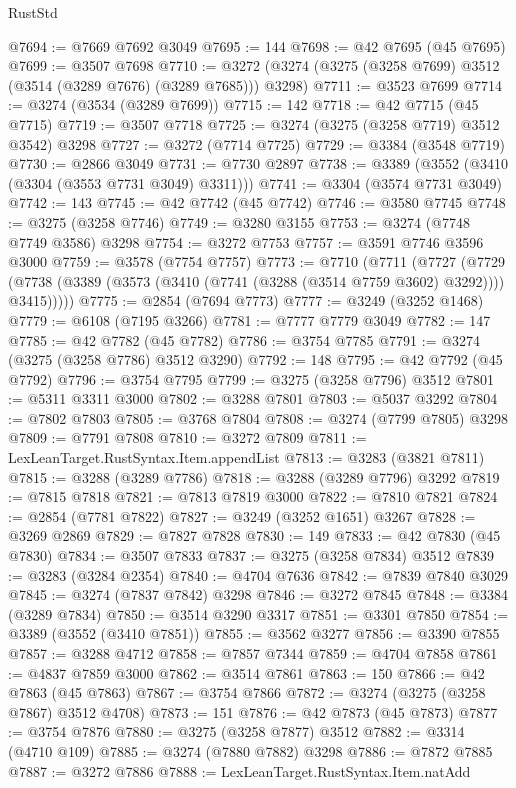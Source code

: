 \begin{lexlean}{RustStd}
\begin{coremodule}
@7694 := @7669 @7692 @3049
@7695 := 144
@7698 := @42 @7695 (@45 @7695)
@7699 := @3507 @7698
@7710 := @3272 (@3274 (@3275 (@3258 @7699) @3512 (@3514 (@3289 @7676) (@3289 @7685))) @3298)
@7711 := @3523 @7699
@7714 := @3274 (@3534 (@3289 @7699))
@7715 := 142
@7718 := @42 @7715 (@45 @7715)
@7719 := @3507 @7718
@7725 := @3274 (@3275 (@3258 @7719) @3512 @3542) @3298
@7727 := @3272 (@7714 @7725)
@7729 := @3384 (@3548 @7719)
@7730 := @2866 @3049
@7731 := @7730 @2897
@7738 := @3389 (@3552 (@3410 (@3304 (@3553 @7731 @3049) @3311)))
@7741 := @3304 (@3574 @7731 @3049)
@7742 := 143
@7745 := @42 @7742 (@45 @7742)
@7746 := @3580 @7745
@7748 := @3275 (@3258 @7746)
@7749 := @3280 @3155
@7753 := @3274 (@7748 @7749 @3586) @3298
@7754 := @3272 @7753
@7757 := @3591 @7746 @3596 @3000
@7759 := @3578 (@7754 @7757)
@7773 := @7710
    (@7711
      (@7727
        (@7729 (@7738 (@3389 (@3573 (@3410 (@7741 (@3288 (@3514 @7759 @3602) @3292)))) @3415)))))
@7775 := @2854 (@7694 @7773)
@7777 := @3249 (@3252 @1468)
@7779 := @6108 (@7195 @3266)
@7781 := @7777 @7779 @3049
@7782 := 147
@7785 := @42 @7782 (@45 @7782)
@7786 := @3754 @7785
@7791 := @3274 (@3275 (@3258 @7786) @3512 @3290)
@7792 := 148
@7795 := @42 @7792 (@45 @7792)
@7796 := @3754 @7795
@7799 := @3275 (@3258 @7796) @3512
@7801 := @5311 @3311 @3000
@7802 := @3288 @7801
@7803 := @5037 @3292
@7804 := @7802 @7803
@7805 := @3768 @7804
@7808 := @3274 (@7799 @7805) @3298
@7809 := @7791 @7808
@7810 := @3272 @7809
@7811 := LexLeanTarget.RustSyntax.Item.appendList
@7813 := @3283 (@3821 @7811)
@7815 := @3288 (@3289 @7786)
@7818 := @3288 (@3289 @7796) @3292
@7819 := @7815 @7818
@7821 := @7813 @7819 @3000
@7822 := @7810 @7821
@7824 := @2854 (@7781 @7822)
@7827 := @3249 (@3252 @1651) @3267
@7828 := @3269 @2869
@7829 := @7827 @7828
@7830 := 149
@7833 := @42 @7830 (@45 @7830)
@7834 := @3507 @7833
@7837 := @3275 (@3258 @7834) @3512
@7839 := @3283 (@3284 @2354)
@7840 := @4704 @7636
@7842 := @7839 @7840 @3029
@7845 := @3274 (@7837 @7842) @3298
@7846 := @3272 @7845
@7848 := @3384 (@3289 @7834)
@7850 := @3514 @3290 @3317
@7851 := @3301 @7850
@7854 := @3389 (@3552 (@3410 @7851))
@7855 := @3562 @3277
@7856 := @3390 @7855
@7857 := @3288 @4712
@7858 := @7857 @7344
@7859 := @4704 @7858
@7861 := @4837 @7859 @3000
@7862 := @3514 @7861
@7863 := 150
@7866 := @42 @7863 (@45 @7863)
@7867 := @3754 @7866
@7872 := @3274 (@3275 (@3258 @7867) @3512 @4708)
@7873 := 151
@7876 := @42 @7873 (@45 @7873)
@7877 := @3754 @7876
@7880 := @3275 (@3258 @7877) @3512
@7882 := @3314 (@4710 @109)
@7885 := @3274 (@7880 @7882) @3298
@7886 := @7872 @7885
@7887 := @3272 @7886
@7888 := LexLeanTarget.RustSyntax.Item.natAdd

\end{coremodule}
\end{lexlean}
